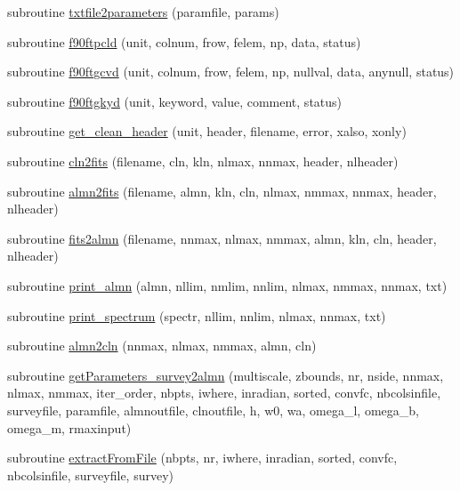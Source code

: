 \begin{DoxyCompactItemize}
\item 
subroutine \hyperlink{namespacef3dex_a4e944841262cc3bac00e25f2d188804d}{txtfile2parameters} (paramfile, params)
\item 
subroutine \hyperlink{namespacef3dex_a1c162e19667698db3dad6391a9bcd797}{f90ftpcld} (unit, colnum, frow, felem, np, data, status)
\item 
subroutine \hyperlink{namespacef3dex_a8bb386e1b869c35df30978b7e634b234}{f90ftgcvd} (unit, colnum, frow, felem, np, nullval, data, anynull, status)
\item 
subroutine \hyperlink{namespacef3dex_abb1777616669f320b1792a0e8aba490a}{f90ftgkyd} (unit, keyword, value, comment, status)
\item 
subroutine \hyperlink{namespacef3dex_a11254efdbb3dec3e0a04346a3b4420b7}{get\_\-clean\_\-header} (unit, header, filename, error, xalso, xonly)
\item 
subroutine \hyperlink{namespacef3dex_a9973d07e7dbafd1082de1d3b37088668}{cln2fits} (filename, cln, kln, nlmax, nnmax, header, nlheader)
\item 
subroutine \hyperlink{namespacef3dex_a11f3efc39a60c9d26a79c13bfe936ebc}{almn2fits} (filename, almn, kln, cln, nlmax, nmmax, nnmax, header, nlheader)
\item 
subroutine \hyperlink{namespacef3dex_a6630d20765692f55b9c5389e877e35ae}{fits2almn} (filename, nnmax, nlmax, nmmax, almn, kln, cln, header, nlheader)
\item 
subroutine \hyperlink{namespacef3dex_aa083709f672c84c29ddbe82767394723}{print\_\-almn} (almn, nllim, nmlim, nnlim, nlmax, nmmax, nnmax, txt)
\item 
subroutine \hyperlink{namespacef3dex_ac047f1cdd1135ef77143db2f2dc67259}{print\_\-spectrum} (spectr, nllim, nnlim, nlmax, nnmax, txt)
\item 
subroutine \hyperlink{namespacef3dex_a0e8960adb17a10a71b92df15ba3f63d8}{almn2cln} (nnmax, nlmax, nmmax, almn, cln)
\item 
subroutine \hyperlink{namespacef3dex_ab59d82bd4e0bbb4ce1d8149ac252b8c4}{getParameters\_\-survey2almn} (multiscale, zbounds, nr, nside, nnmax, nlmax, nmmax, iter\_\-order, nbpts, iwhere, inradian, sorted, convfc, nbcolsinfile, surveyfile, paramfile, almnoutfile, clnoutfile, h, w0, wa, omega\_\-l, omega\_\-b, omega\_\-m, rmaxinput)
\item 
subroutine \hyperlink{namespacef3dex_a2efa7687f0b6591321e5c86ea09aa1a7}{extractFromFile} (nbpts, nr, iwhere, inradian, sorted, convfc, nbcolsinfile, surveyfile, survey)

\end{DoxyCompactItemize}
